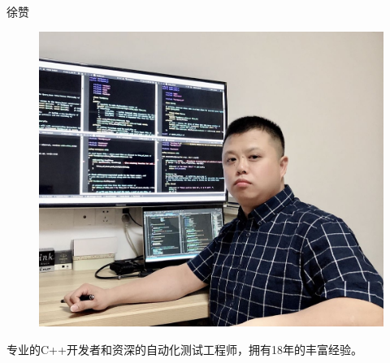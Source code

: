 \documentclass[./简历]{subfiles}
\begin{document}
    \begin{center}
        {\LARGE{徐\qquad{}赞}}
    \end{center}
    \begin{figure}[th]
        \centering
        \includegraphics[width=1\columnwidth]{Portrait.jpg}\\[-1.5em]
    \end{figure}
    \begin{center}            
        {专业的C++开发者和资深的自动化测试工程师，拥有18年的丰富经验。}
        \\[0.3cm]
    \end{center}
\end{document}
